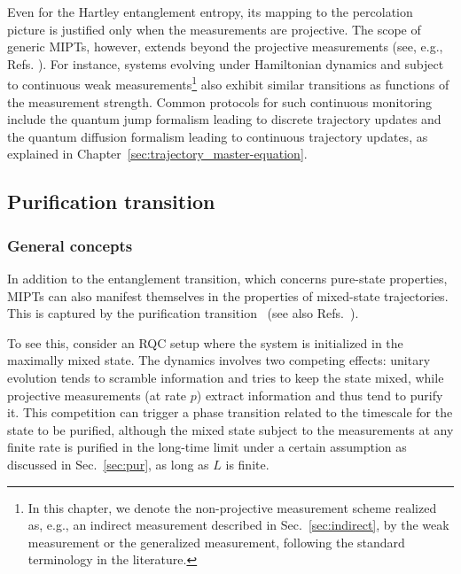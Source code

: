 \documentclass[preprint,pteplogo]{ptephy_v2}%
\numberwithin{equation}{section}
\theoremstyle{definition}
\begin{document}
Even for the Hartley entanglement entropy, its mapping to the percolation picture is justified only when the measurements are projective.
The scope of generic MIPTs, however, extends beyond the projective measurements (see, e.g., Refs. \cite{Szyniszewski2019entanglement, Fuji2020measurement, Alberton2020entanglement, bao20theory, Turkeshi21measurement, LeGal24entanglement}).
For instance, systems evolving under Hamiltonian dynamics and subject to continuous weak measurements\footnote{
In this chapter, we denote the non-projective measurement scheme realized as, e.g., an indirect measurement described in Sec.~\ref{sec:indirect}, by the weak measurement or the generalized measurement, following the standard terminology in the literature.
} also exhibit similar transitions as functions of the measurement strength.
Common protocols for such continuous monitoring include the quantum jump formalism leading to discrete trajectory updates and the quantum diffusion formalism leading to continuous trajectory updates, as explained in Chapter~\ref{sec:trajectory_master-equation}.

\subsection{Purification transition}
\label{sec:purification_MIPT}
\subsubsection{General concepts}
In addition to the entanglement transition, which concerns pure-state properties, MIPTs can also manifest themselves in the properties of mixed-state trajectories.
This is captured by the purification transition~\cite{gullans2020dynamical} (see also Refs.~\cite{loio2023purification, Sierant22measurement}).

To see this, consider an RQC setup where the system is initialized in the maximally mixed state.
The dynamics involves two competing effects: unitary evolution tends to scramble information and tries to keep the state mixed, while projective measurements (at rate $p$) extract information and thus tend to purify it.
This competition can trigger a phase transition related to the timescale for the state to be purified, although the mixed state subject to the measurements at any finite rate is purified in the long-time limit under a certain assumption as discussed in Sec.~\ref{sec:pur}, as long as $L$ is finite.
\end{document}
